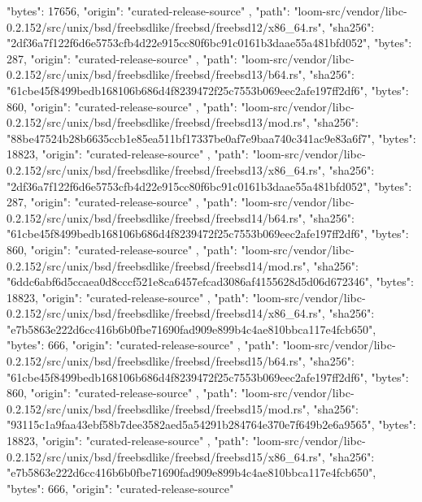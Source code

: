 {{      "bytes": 17656,
      "origin": "curated-release-source"
    },
    {
      "path": "loom-src/vendor/libc-0.2.152/src/unix/bsd/freebsdlike/freebsd/freebsd12/x86_64.rs",
      "sha256": "2df36a7f122f6d6e5753cfb4d22e915cc80f6bc91c0161b3daae55a481bfd052",
      "bytes": 287,
      "origin": "curated-release-source"
    },
    {
      "path": "loom-src/vendor/libc-0.2.152/src/unix/bsd/freebsdlike/freebsd/freebsd13/b64.rs",
      "sha256": "61cbe45f8499bedb168106b686d4f8239472f25c7553b069eec2afe197ff2df6",
      "bytes": 860,
      "origin": "curated-release-source"
    },
    {
      "path": "loom-src/vendor/libc-0.2.152/src/unix/bsd/freebsdlike/freebsd/freebsd13/mod.rs",
      "sha256": "88be47524b28b6635ccb1e85ea511bf17337be0af7e9baa740c341ac9e83a6f7",
      "bytes": 18823,
      "origin": "curated-release-source"
    },
    {
      "path": "loom-src/vendor/libc-0.2.152/src/unix/bsd/freebsdlike/freebsd/freebsd13/x86_64.rs",
      "sha256": "2df36a7f122f6d6e5753cfb4d22e915cc80f6bc91c0161b3daae55a481bfd052",
      "bytes": 287,
      "origin": "curated-release-source"
    },
    {
      "path": "loom-src/vendor/libc-0.2.152/src/unix/bsd/freebsdlike/freebsd/freebsd14/b64.rs",
      "sha256": "61cbe45f8499bedb168106b686d4f8239472f25c7553b069eec2afe197ff2df6",
      "bytes": 860,
      "origin": "curated-release-source"
    },
    {
      "path": "loom-src/vendor/libc-0.2.152/src/unix/bsd/freebsdlike/freebsd/freebsd14/mod.rs",
      "sha256": "6ddc6abf6d5ccaea0d8cccf521e8ca6457efcad3086af4155628d5d06d672346",
      "bytes": 18823,
      "origin": "curated-release-source"
    },
    {
      "path": "loom-src/vendor/libc-0.2.152/src/unix/bsd/freebsdlike/freebsd/freebsd14/x86_64.rs",
      "sha256": "e7b5863e222d6cc416b6b0fbe71690fad909e899b4c4ae810bbca117e4fcb650",
      "bytes": 666,
      "origin": "curated-release-source"
    },
    {
      "path": "loom-src/vendor/libc-0.2.152/src/unix/bsd/freebsdlike/freebsd/freebsd15/b64.rs",
      "sha256": "61cbe45f8499bedb168106b686d4f8239472f25c7553b069eec2afe197ff2df6",
      "bytes": 860,
      "origin": "curated-release-source"
    },
    {
      "path": "loom-src/vendor/libc-0.2.152/src/unix/bsd/freebsdlike/freebsd/freebsd15/mod.rs",
      "sha256": "93115c1a9faa43ebf58b7dee3582aed5a54291b284764e370e7f649b2e6a9565",
      "bytes": 18823,
      "origin": "curated-release-source"
    },
    {
      "path": "loom-src/vendor/libc-0.2.152/src/unix/bsd/freebsdlike/freebsd/freebsd15/x86_64.rs",
      "sha256": "e7b5863e222d6cc416b6b0fbe71690fad909e899b4c4ae810bbca117e4fcb650",
      "bytes": 666,
      "origin": "curated-release-source"
}}
